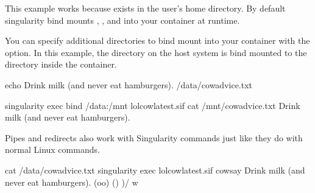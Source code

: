 \documentclass[letterpaper,10pt,english]{sphinxmanual}
\begin{document}
This example works because  exists in the user’s home directory.
By default singularity bind mounts , , and  into
your container at runtime.

You can specify additional directories to bind mount into your container with
the  option. In this example, the 
directory on the host system is bind mounted to the  directory inside
the container.

%
\begin{sphinxVerbatim}[commandchars=\\\{\}]
\PYGZdl{} echo \PYGZdq{}Drink milk (and never eat hamburgers).\PYGZdq{} \PYGZgt{} /data/cow\PYGZus{}advice.txt

\PYGZdl{} singularity exec \PYGZhy{}\PYGZhy{}bind /data:/mnt lolcow\PYGZus{}latest.sif cat /mnt/cow\PYGZus{}advice.txt
Drink milk (and never eat hamburgers).
\end{sphinxVerbatim}

Pipes and redirects also work with Singularity commands just like they do with
normal Linux commands.

%
\begin{sphinxVerbatim}[commandchars=\\\{\}]
\PYGZdl{} cat /data/cow\PYGZus{}advice.txt \textbar{} singularity exec lolcow\PYGZus{}latest.sif cowsay
 \PYGZus{}\PYGZus{}\PYGZus{}\PYGZus{}\PYGZus{}\PYGZus{}\PYGZus{}\PYGZus{}\PYGZus{}\PYGZus{}\PYGZus{}\PYGZus{}\PYGZus{}\PYGZus{}\PYGZus{}\PYGZus{}\PYGZus{}\PYGZus{}\PYGZus{}\PYGZus{}\PYGZus{}\PYGZus{}\PYGZus{}\PYGZus{}\PYGZus{}\PYGZus{}\PYGZus{}\PYGZus{}\PYGZus{}\PYGZus{}\PYGZus{}\PYGZus{}\PYGZus{}\PYGZus{}\PYGZus{}\PYGZus{}\PYGZus{}\PYGZus{}\PYGZus{}\PYGZus{}
\PYGZlt{} Drink milk (and never eat hamburgers). \PYGZgt{}
 \PYGZhy{}\PYGZhy{}\PYGZhy{}\PYGZhy{}\PYGZhy{}\PYGZhy{}\PYGZhy{}\PYGZhy{}\PYGZhy{}\PYGZhy{}\PYGZhy{}\PYGZhy{}\PYGZhy{}\PYGZhy{}\PYGZhy{}\PYGZhy{}\PYGZhy{}\PYGZhy{}\PYGZhy{}\PYGZhy{}\PYGZhy{}\PYGZhy{}\PYGZhy{}\PYGZhy{}\PYGZhy{}\PYGZhy{}\PYGZhy{}\PYGZhy{}\PYGZhy{}\PYGZhy{}\PYGZhy{}\PYGZhy{}\PYGZhy{}\PYGZhy{}\PYGZhy{}\PYGZhy{}\PYGZhy{}\PYGZhy{}\PYGZhy{}\PYGZhy{}
        \PYGZbs{}   \PYGZca{}\PYGZus{}\PYGZus{}\PYGZca{}
         \PYGZbs{}  (oo)\PYGZbs{}\PYGZus{}\PYGZus{}\PYGZus{}\PYGZus{}\PYGZus{}\PYGZus{}\PYGZus{}
            (\PYGZus{}\PYGZus{})\PYGZbs{}       )\PYGZbs{}/\PYGZbs{}
                \textbar{}\textbar{}\PYGZhy{}\PYGZhy{}\PYGZhy{}\PYGZhy{}w \textbar{}
                \textbar{}\textbar{}     \textbar{}\textbar{}
\end{sphinxVerbatim}
\end{document}
